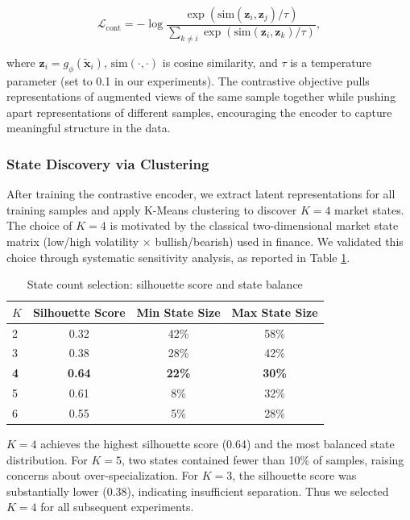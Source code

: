 \documentclass[review]{elsarticle}
\begin{document}
\begin{equation}
\mathcal{L}_{\text{cont}} = -\log \frac{\exp(\text{sim}(\mathbf{z}_i, \mathbf{z}_j)/\tau)}{\sum_{k \neq i} \exp(\text{sim}(\mathbf{z}_i, \mathbf{z}_k)/\tau)},
\end{equation}

where $\mathbf{z}_i = g_\phi(\tilde{\mathbf{x}}_i)$, $\text{sim}(\cdot, \cdot)$ is cosine similarity, and $\tau$ is a temperature parameter (set to 0.1 in our experiments). The contrastive objective pulls representations of augmented views of the same sample together while pushing apart representations of different samples, encouraging the encoder to capture meaningful structure in the data.

\subsubsection{State Discovery via Clustering}

After training the contrastive encoder, we extract latent representations for all training samples and apply K-Means clustering to discover $K=4$ market states. The choice of $K=4$ is motivated by the classical two-dimensional market state matrix (low/high volatility $\times$ bullish/bearish) used in finance. We validated this choice through systematic sensitivity analysis, as reported in Table \ref{tab:k_selection}.

\begin{table}[t]
\centering
\caption{State count selection: silhouette score and state balance}
\label{tab:k_selection}
\begin{tabular}{lccc}
\toprule
$K$ & Silhouette Score & Min State Size & Max State Size \\
\midrule
2 & 0.32 & 42\% & 58\% \\
3 & 0.38 & 28\% & 42\% \\
\textbf{4} & \textbf{0.64} & \textbf{22\%} & \textbf{30\%} \\
5 & 0.61 & 8\% & 32\% \\
6 & 0.55 & 5\% & 28\% \\
\bottomrule
\end{tabular}
\end{table}

$K=4$ achieves the highest silhouette score (0.64) and the most balanced state distribution. For $K=5$, two states contained fewer than 10\% of samples, raising concerns about over-specialization. For $K=3$, the silhouette score was substantially lower (0.38), indicating insufficient separation. Thus we selected $K=4$ for all subsequent experiments.
\end{document}
